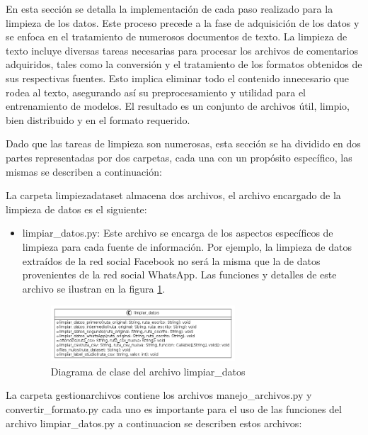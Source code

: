 En esta sección se detalla la implementación de cada paso realizado para la limpieza de los datos. Este proceso precede a la fase de adquisición de los datos y se enfoca en el tratamiento de numerosos documentos de texto. La limpieza de texto incluye diversas tareas necesarias para procesar los archivos de comentarios adquiridos, tales como la conversión y el tratamiento de los formatos obtenidos de sus respectivas fuentes. Esto implica eliminar todo el contenido innecesario que rodea al texto, asegurando así su preprocesamiento y utilidad para el entrenamiento de modelos. El resultado es un conjunto de archivos útil, limpio, bien distribuido y en el formato requerido. 

Dado que las tareas de limpieza son numerosas, esta sección se ha dividido en dos partes representadas por dos carpetas, cada una con un propósito específico, las mismas se describen a continuación:

La carpeta limpiezadataset almacena dos archivos, el archivo encargado de la limpieza de datos es el siguiente:

\begin{itemize}

\item limpiar\_datos.py: Este archivo se encarga de los aspectos específicos de limpieza para cada fuente de información. Por ejemplo, la limpieza de datos extraídos de la red social Facebook no será la misma que la de datos provenientes de la red social WhatsApp. Las funciones y detalles de este archivo se ilustran en la figura \ref{fig:uml1}.

\begin{figure}[h!]
	\includegraphics[width=0.65\textwidth]{capitulo5/figuras/fig1.png}
	\caption{Diagrama de clase del archivo limpiar\_datos}
	\label{fig:uml1}
\end{figure}

\end{itemize}


La carpeta gestionarchivos contiene los archivos manejo\_archivos.py y convertir\_formato.py cada uno es importante para el uso de las funciones del archivo limpiar\_datos.py a continuacion se describen estos archivos:

